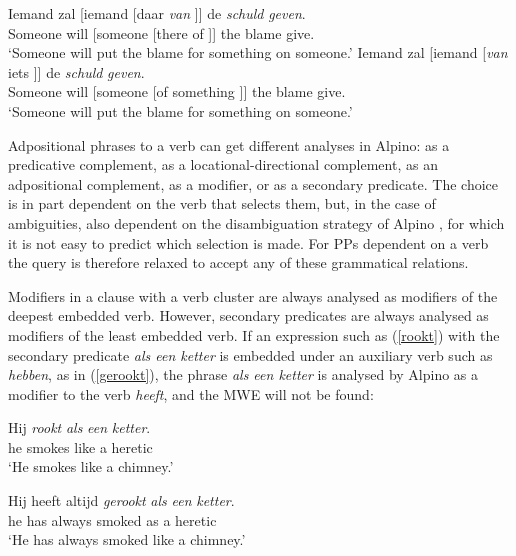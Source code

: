 \documentclass[output=paper,colorlinks,citecolor=brown]{langscibook}
\begin{document}
\begin{exe}
\ex \label{iemandbracketing}
\begin{xlist}
\ex \gll Iemand zal [iemand [daar \textit{van} ]] de \textit{schuld} \textit{geven}.\\
Someone will [someone [there of ]] the blame give.\\
\glt `Someone will put the blame for something on someone.'
\ex \gll Iemand zal [iemand [\textit{van} iets ]] de \textit{schuld} \textit{geven}.\\
Someone will [someone [of something ]] the blame give.\\
\glt `Someone will put the blame for something on someone.'
\end{xlist}
\end{exe}


 Adpositional  phrases to a verb can get different analyses in Alpino: as a predicative complement, as a locational-directional complement, as an adpositional complement,  as a modifier, or as a secondary predicate. The choice is in part dependent on the verb that selects them, but, in the case of ambiguities, also dependent on the disambiguation strategy of Alpino \citep{VanNoord:2006}, for which it is not easy to predict which selection is made. For PPs dependent on  a verb the query is therefore relaxed to accept any of these grammatical relations.

 Modifiers in a clause with a verb cluster are always analysed as modifiers of the deepest embedded verb. However, secondary predicates are always analysed as modifiers of the least embedded verb. If an expression such as (\ref{rookt}) with the secondary predicate \textit{als een ketter} is embedded under an auxiliary verb such as \textit{hebben}, as in (\ref{gerookt}), the phrase \textit{als een ketter} is analysed by Alpino as a modifier to the verb \textit{heeft}, and the MWE will not be found:

\begin{exe}
\ex \gll Hij \textit{rookt} \textit{als} \textit{een} \textit{ketter}.\\
he smokes like a heretic\\ \label{rookt}
\glt `He smokes like a chimney.'

\ex \gll Hij heeft altijd \textit{gerookt} \textit{als} \textit{een} \textit{ketter}.\\
he has always smoked as a heretic\\  \label{gerookt}
\glt `He has always smoked like a chimney.'
\end{exe}
\end{document}
